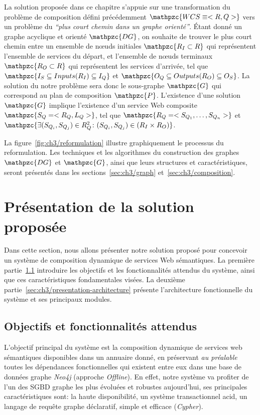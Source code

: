 La solution proposée dans ce chapitre s'appuie sur une transformation
du problème de composition défini précédemment
$\mathpzc{WCS \equiv <R,Q>}$ vers un problème du \textit{``plus court
  chemin dans un graphe orienté''}. Étant donné un graphe acyclique et
orienté $\mathpzc{DG}$, on souhaite de trouver le plus court chemin
entre un ensemble de nœuds initiales $\mathpzc{R_I \subset R}$ qui
représentent l'ensemble de services du départ, et l'ensemble de nœuds
terminaux $\mathpzc{R_O \subset R}$ qui représentent les services
d'arrivée, tel que $\mathpzc{I_S \subseteq Inputs(R_I) \subseteq I_Q}$
et $\mathpzc{O_Q \subseteq Outputs(R_O) \subseteq O_S}$. La solution
du notre problème sera donc le sous-graphe $\mathpzc{G}$ qui
correspond au plan de composition $\mathpzc{P}$. L'existence d'une
solution $\mathpzc{G}$ implique l'existence d'un service Web composite
$\mathpzc{S_Q= <R_Q, L_Q>}$, tel que
$\mathpzc{R_Q= <S_{Q_1}, \dots, S_{Q_n}>}$ et
$\mathpzc{\exists (S_{Q_i},S_{Q_j}) \in R_Q^2 \colon (S_{Q_i},S_{Q_j})
  \in (R_I \times R_O)}$.\medskip

La figure~\ref{fig:ch3/reformulation} illustre graphiquement le
processus du reformulation. Les techniques et les algorithmes du
construction des graphes $\mathpzc{DG}$ et $\mathpzc{G}$, ainsi que
leurs structures et caractéristiques, seront présentés dans les
sections~\ref{sec:ch3/graph} et~\ref{sec:ch3/composition}.\medskip

\section{Présentation de la solution proposée}
\label{sec:ch3/presentation}

Dans cette section, nous allons présenter notre solution proposé pour
concevoir un système de composition dynamique de services Web
sémantiques. La première partie~\ref{sec:ch3/presentation-goals}
introduire les objectifs et les fonctionnalités attendus du système,
ainsi que ces caractéristiques fondamentales visées. La deuxième
partie~\ref{sec:ch3/presentation-architecture} présente l'architecture
fonctionnelle du système et ses principaux modules.

\subsection{Objectifs et fonctionnalités attendus}
\label{sec:ch3/presentation-goals}

L'objectif principal du système est la composition dynamique de
services web sémantiques disponibles dans un annuaire donné, en
préservant \emph{au préalable} toutes les dépendances fonctionnelles
qui existent entre eux dans une base de données graphe \emph{Neo4j}
(approche \emph{Offline}). En effet, notre système va profiter de l'un
des \acrshort{SGBD} graphe les plus évoluées et robustes aujourd'hui,
ses principales caractéristiques sont: la haute disponibilité, un
système transactionnel \acrshort{acid}, un langage de requête graphe
déclaratif, simple et efficace (\emph{Cypher}).\medskip

